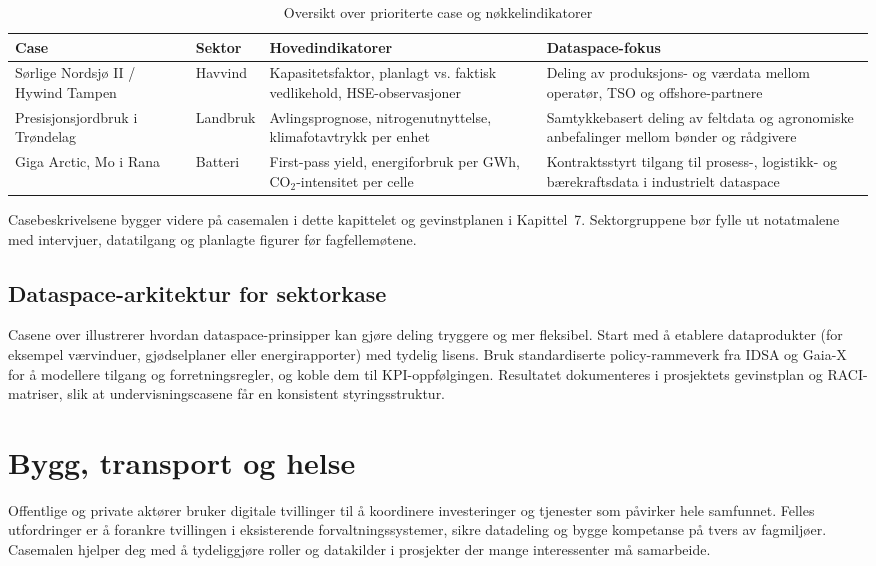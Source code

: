 \begin{table}[h]
    \centering
    \caption{Oversikt over prioriterte case og nøkkelindikatorer}
    \label{tab:prioriterte-case}
    \begin{tabular}{p{3.2cm}p{2.6cm}p{4.6cm}p{3.6cm}}
        \toprule
        Case & Sektor & Hovedindikatorer & Dataspace-fokus \\
        \midrule
        Sørlige Nordsjø II / Hywind Tampen & Havvind & Kapasitetsfaktor, planlagt vs. faktisk vedlikehold, HSE-observasjoner & Deling av produksjons- og værdata mellom operatør, TSO og offshore-partnere \\
        Presisjonsjordbruk i Trøndelag & Landbruk & Avlingsprognose, nitrogenutnyttelse, klimafotavtrykk per enhet & Samtykkebasert deling av feltdata og agronomiske anbefalinger mellom bønder og rådgivere \\
        Giga Arctic, Mo i Rana & Batteri & First-pass yield, energiforbruk per GWh, CO$_2$-intensitet per celle & Kontraktsstyrt tilgang til prosess-, logistikk- og bærekraftsdata i industrielt dataspace \\
        \bottomrule
    \end{tabular}
\end{table}

Casebeskrivelsene bygger videre på casemalen i dette kapittelet og gevinstplanen i Kapittel~7. Sektorgruppene bør fylle ut notatmalene med intervjuer, datatilgang og planlagte figurer før fagfellemøtene.

\subsection*{Dataspace-arkitektur for sektorkase}
Casene over illustrerer hvordan dataspace-prinsipper kan gjøre deling tryggere og mer fleksibel. Start med å etablere dataprodukter (for eksempel værvinduer, gjødselplaner eller energirapporter) med tydelig lisens. Bruk standardiserte policy-rammeverk fra IDSA og Gaia-X for å modellere tilgang og forretningsregler, og koble dem til KPI-oppfølgingen.\citep{idsa2023ram,gaiax2023architecture} Resultatet dokumenteres i prosjektets gevinstplan og RACI-matriser, slik at undervisningscasene får en konsistent styringsstruktur.

\section{Bygg, transport og helse}
Offentlige og private aktører bruker digitale tvillinger til å koordinere investeringer og tjenester som påvirker hele samfunnet. Felles utfordringer er å forankre tvillingen i eksisterende forvaltningssystemer, sikre datadeling og bygge kompetanse på tvers av fagmiljøer. Casemalen hjelper deg med å tydeliggjøre roller og datakilder i prosjekter der mange interessenter må samarbeide.

